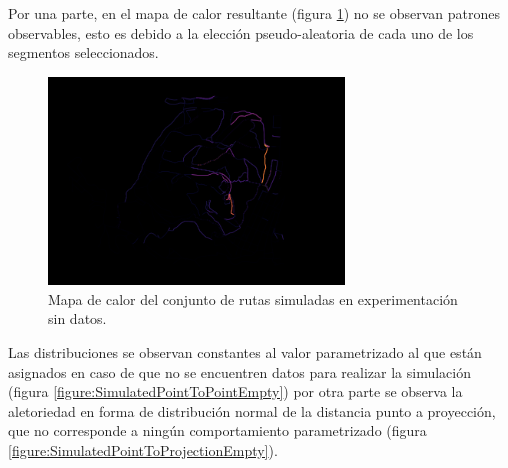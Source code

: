 Por una parte, en el mapa de calor resultante (figura \ref{figure:SimulatedHeatMapEmpty}) no se 
observan patrones observables, esto es debido a la elección pseudo-aleatoria de cada uno de los 
segmentos seleccionados.

\begin{figure}[!htb]
\begin{center}
\includegraphics[width=0.7\textwidth]{./Imagenes/HeatMapEmpty.png}
\caption{Mapa de calor del conjunto de rutas simuladas en experimentación sin datos.}
\label{figure:SimulatedHeatMapEmpty}
\end{center}
\end{figure}
\newpage
Las distribuciones se observan constantes al valor parametrizado al que están asignados en caso 
de que no se encuentren datos para realizar la simulación (figura \ref{figure:SimulatedPointToPointEmpty}) por 
otra parte se observa la aletoriedad en forma de distribución normal de la distancia punto a proyección, que no 
corresponde a ningún comportamiento parametrizado (figura \ref{figure:SimulatedPointToProjectionEmpty}).
